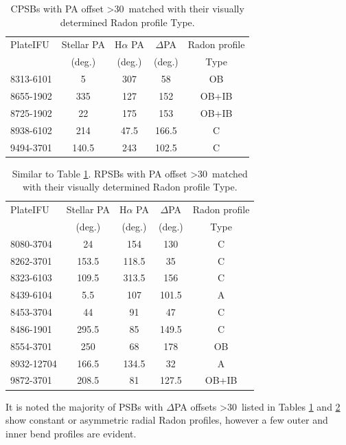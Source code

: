 \begin{table}
\centering
\caption{CPSBs with PA offset \textgreater 30\textdegree\ matched with their visually determined Radon profile Type.}
\label{tab:offsetCPSBs-Radon-Type}
\begin{tabular}{lcccc}
\hline
PlateIFU  & Stellar PA & H$\alpha$ PA & $\Delta$PA & Radon profile\\
  & (deg.) & (deg.) & (deg.) & Type \\
\hline
8313-6101 & 5 & 307 & 58 & OB \\
8655-1902 & 335 & 127 & 152 & OB+IB \\
8725-1902 & 22 & 175 & 153 & OB+IB \\
8938-6102 & 214 & 47.5 & 166.5 & C \\
9494-3701 & 140.5 & 243 & 102.5 & C \\
\hline
\end{tabular}
\end{table}

\begin{table}
\centering
\caption[RPSBs with PA offset \textgreater 30\textdegree\ matched with their visually determined Radon profile Type]{Similar to Table \ref{tab:offsetCPSBs-Radon-Type}. RPSBs with PA offset \textgreater 30\textdegree\ matched with their visually determined Radon profile Type.}
\label{tab:offsetRPSBs-Radon-Type}
\begin{tabular}{lcccc}
\hline
PlateIFU   & Stellar PA & H$\alpha$ PA & $\Delta$PA & Radon profile \\
  & (deg.) & (deg.) & (deg.) & Type\\
\hline
8080-3704 & 24 & 154 & 130 & C \\
8262-3701 & 153.5 & 118.5 & 35 & C \\
8323-6103 & 109.5 & 313.5 & 156 & C \\
8439-6104 & 5.5 & 107 & 101.5 & A \\
8453-3704 & 44 & 91 & 47 & C \\
8486-1901 & 295.5 & 85 & 149.5 & C \\
8554-3701 & 250 & 68 & 178 & OB \\
8932-12704 & 166.5 & 134.5 & 32 & A \\
9872-3701 & 208.5 & 81 & 127.5 & OB+IB \\
\hline
\end{tabular}
\end{table}

It is noted the majority of PSBs with $\Delta$PA offsets \textgreater 30\textdegree\ listed in Tables \ref{tab:offsetCPSBs-Radon-Type} and \ref{tab:offsetRPSBs-Radon-Type} show constant or asymmetric radial Radon profiles, however a few outer and inner bend profiles are evident. 

